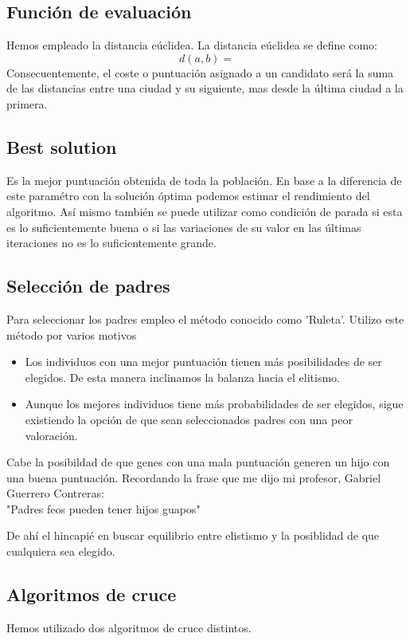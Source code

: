 \documentclass{article}
\begin{document}
\subsection{Función de evaluación}
    Hemos empleado la distancia eúclidea. La distancia eúclidea se define como: 
        \[d(a,b)=\]
    Consecuentemente, el coste o puntuación asignado a un candidato será la suma de las 
    distancias entre una ciudad y su siguiente, mas desde la última ciudad a la primera.  

\subsection{Best solution}
    Es la mejor puntuación obtenida de toda la población. En base a la diferencia de este paramétro con la solución óptima 
    podemos estimar el rendimiento del algoritmo. Así mismo también se puede utilizar como condición de parada si esta es 
    lo suficientemente buena o si las variaciones de su valor en las últimas iteraciones no es lo suficientemente grande. 
    
\subsection{Selección de padres}
    Para seleccionar los padres empleo el método conocido como 'Ruleta'. Utilizo este método por varios motivos 
    \begin{itemize}
        \item Los individuos con una mejor puntuación tienen más posibilidades de ser elegidos. De esta manera inclinamos 
        la balanza hacia el elitismo. 
        \item Aunque los mejores individuos tiene más probabilidades de ser elegidos, sigue existiendo la opción de que sean 
        seleccionados padres con una peor valoración. 
    \end{itemize}  
    Cabe la posibildad de que genes con una mala puntuación generen un hijo con una buena puntuación. Recordando la frase 
    que me dijo mi profesor, Gabriel Guerrero Contreras: \\
        
    \hspace{5mm}"Padres feos pueden tener hijos guapos"
    
    De ahí el hincapié en buscar equilibrio entre elistismo y la posiblidad de que cualquiera sea elegido. 

\subsection{Algoritmos de cruce}
Hemos utilizado dos algoritmos de cruce distintos.
\end{document}
